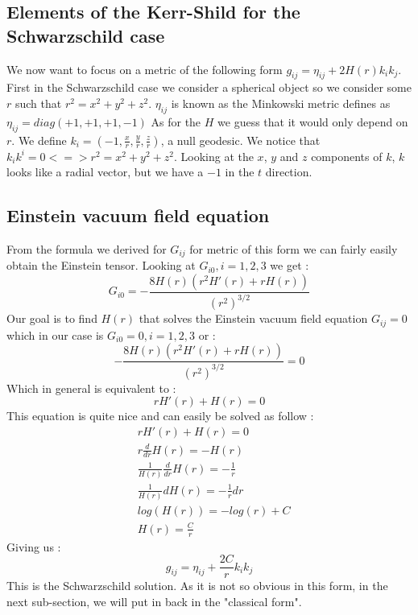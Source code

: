 \documentclass[a4paper,12pt]{article}
\begin{document}
\subsection{Elements of the Kerr-Shild for the Schwarzschild case}
We now want to focus on a metric of the following form $g_{ij}=\eta_{ij}+2H(r)k_ik_j$.
First in the Schwarzschild case we consider a spherical object so we consider some $r$ such that $r^2=x^2+y^2+z^2$.
$\eta_{ij}$ is known as the Minkowski metric defines as $\eta_{ij}=diag(+1,+1,+1,-1)$
As for the $H$ we guess that it would only depend on $r$.
We define $k_i=(-1,\frac{x}{r},\frac{y}{r},\frac{z}{r})$, a null geodesic.
We notice that $k_ik^i=0 <=> r^2=x^2+y^2+z^2$.
Looking at the $x$, $y$ and $z$ components of $k$, $k$ looks like a radial vector, but we have a $-1$ in the $t$ direction.
\subsection{Einstein vacuum field equation}
From the formula we derived for $G_{ij}$ for metric of this form we can fairly easily obtain the Einstein tensor.
Looking at $G_{i0}, i=1,2,3$ we get :
\begin{equation}
	G_{i0}=-\frac{8 H(r) \left(r^2 H'(r)+rH(r)\right)}{\left(r^2\right)^{3/2}}
\end{equation}
Our goal is to find $H(r)$ that solves the Einstein vacuum field equation $G_{ij}=0$ which in our case is $G_{i0}=0, i=1,2,3$ or :
\begin{equation}
	-\frac{8 H(r) \left(r^2 H'(r)+rH(r)\right)}{\left(r^2\right)^{3/2}}=0
\end{equation}
Which in general is equivalent to :
\begin{equation}
	rH'(r)+H(r)=0
\end{equation}
This equation is quite nice and can easily be solved as follow :
\begin{align*}
	&rH'(r)+H(r)=0\\
	&r\frac{d}{dr}H(r)=-H(r)\\
	&\frac{1}{H(r)}\frac{d}{dr}H(r)=-\frac{1}{r}\\
	&\frac{1}{H(r)}dH(r)=-\frac{1}{r}dr\\
	&log(H(r))=-log(r)+C\\
	&H(r)=\frac{C}{r}
\end{align*}
Giving us :
\begin{equation}
	g_{ij}=\eta_{ij}+\frac{2C}{r}k_ik_j
\end{equation}
This is the Schwarzschild solution. As it is not so obvious in this form, in the next sub-section, we will put in back in the "classical form".
\end{document}
